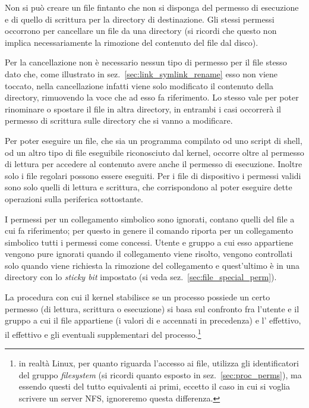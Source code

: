 Non si può creare un file fintanto che non si disponga del permesso di
esecuzione e di quello di scrittura per la directory di destinazione. Gli
stessi permessi occorrono per cancellare un file da una directory (si ricordi
che questo non implica necessariamente la rimozione del contenuto del file dal
disco).

Per la cancellazione non è necessario nessun tipo di permesso per il file
stesso dato che, come illustrato in sez.~\ref{sec:link_symlink_rename} esso
non viene toccato, nella cancellazione infatti viene solo modificato il
contenuto della directory, rimuovendo la voce che ad esso fa riferimento. Lo
stesso vale per poter rinominare o spostare il file in altra directory, in
entrambi i casi occorrerà il permesso di scrittura sulle directory che si
vanno a modificare.

Per poter eseguire un file, che sia un programma compilato od uno script di
shell, od un altro tipo di file eseguibile riconosciuto dal kernel, occorre
oltre al permesso di lettura per accedere al contenuto avere anche il permesso
di esecuzione. Inoltre solo i file regolari possono essere eseguiti. Per i
file di dispositivo i permessi validi sono solo quelli di lettura e scrittura,
che corrispondono al poter eseguire dette operazioni sulla periferica
sottostante. 

I permessi per un collegamento simbolico sono ignorati, contano quelli del
file a cui fa riferimento; per questo in genere il comando  riporta
per un collegamento simbolico tutti i permessi come concessi. Utente e gruppo
a cui esso appartiene vengono pure ignorati quando il collegamento viene
risolto, vengono controllati solo quando viene richiesta la rimozione del
collegamento e quest'ultimo è in una directory con lo \textit{sticky bit}
impostato (si veda sez.~\ref{sec:file_special_perm}).

La procedura con cui il kernel stabilisce se un processo possiede un certo
permesso (di lettura, scrittura o esecuzione) si basa sul confronto fra
l'utente e il gruppo a cui il file appartiene (i valori di  e
 accennati in precedenza) e l' effettivo, il 
effettivo e gli eventuali  supplementari del processo.\footnote{in
  realtà Linux, per quanto riguarda l'accesso ai file, utilizza gli
  identificatori del gruppo \textit{filesystem} (si ricordi quanto esposto in
  sez.~\ref{sec:proc_perms}), ma essendo questi del tutto equivalenti ai primi,
  eccetto il caso in cui si voglia scrivere un server NFS, ignoreremo questa
  differenza.}

